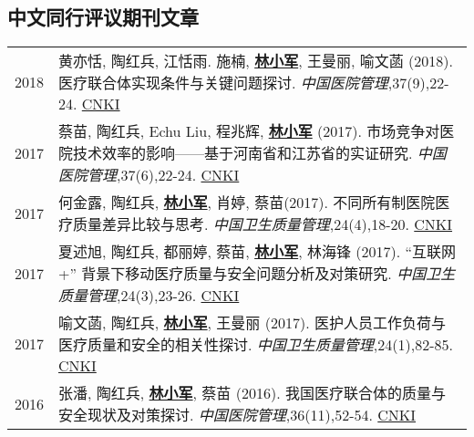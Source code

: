 \documentclass{resume}
\begin{document}
\subsection*{\textbf{中文同行评议期刊文章}}
\begin{longtable}{r p{14cm}}

2018 & 黄亦恬, 陶红兵, 江恬雨. 施楠, \underline{\textbf{林小军}}, 王曼丽, 喻文菡 (2018). 医疗联合体实现条件与关键问题探讨. \emph{中国医院管理},37(9),22-24. \href{http://kns.cnki.net/KCMS/detail/detail.aspx?dbcode=CJFQ&dbname=CJFDLAST2018&filename=YYGL201809005&v=MjIxMjdlWnVadEZpRGxWNzNPUERUTVlyRzRIOW5NcG85RllZUjhlWDFMdXhZUzdEaDFUM3FUcldNMUZyQ1VSTEs=}{CNKI} \\
2017 & 蔡苗, 陶红兵, Echu Liu, 程兆辉, \underline{\textbf{林小军}} (2017). 市场竞争对医院技术效率的影响——基于河南省和江苏省的实证研究. \emph{中国医院管理},37(6),22-24. \href{http://kns.cnki.net/KCMS/detail/detail.aspx?dbcode=CJFQ&dbname=CJFDLAST2017&filename=YYGL201706012&v=MzEzMTREbFZMdkFQRFRNWXJHNEg5Yk1xWTlFWm9SOGVYMUx1eFlTN0RoMVQzcVRyV00xRnJDVVJMS2VadVp0Rmk=}{CNKI}\\
2017 & 何金露, 陶红兵, \underline{\textbf{林小军}}, 肖婷, 蔡苗(2017). 不同所有制医院医疗质量差异比较与思考. \emph{中国卫生质量管理},24(4),18-20. \href{http://kns.cnki.net/KCMS/detail/detail.aspx?dbcode=CJFQ&dbname=CJFDLAST2017&filename=WSJG201704010&v=MTU5NzM0OUVaSVI4ZVgxTHV4WVM3RGgxVDNxVHJXTTFGckNVUkxLZVp1WnRGaURtVTcvTU1qN0JhYkc0SDliTXE=}{CNKI}\\
2017 & 夏述旭, 陶红兵, 都丽婷, 蔡苗, \underline{\textbf{林小军}}, 林海锋 (2017). “互联网+” 背景下移动医疗质量与安全问题分析及对策研究. \emph{中国卫生质量管理},24(3),23-26. \href{http://kns.cnki.net/KCMS/detail/detail.aspx?dbcode=CJFQ&dbname=CJFDLAST2017&filename=WSJG201703030&v=MjQwMTVHWklSOGVYMUx1eFlTN0RoMVQzcVRyV00xRnJDVVJMS2VadVp0RmlEbVViL01NajdCYWJHNEg5Yk1ySTk=}{CNKI}\\
2017 & 喻文菡, 陶红兵, \underline{\textbf{林小军}}, 王曼丽 (2017). 医护人员工作负荷与医疗质量和安全的相关性探讨. \emph{中国卫生质量管理},24(1),82-85. \href{http://kns.cnki.net/KCMS/detail/detail.aspx?dbcode=CJFQ&dbname=CJFDLAST2017&filename=WSJG201701013&v=MDI5NThSOGVYMUx1eFlTN0RoMVQzcVRyV00xRnJDVVJMS2VadVp0RmlEbVY3M09NajdCYWJHNEg5Yk1ybzlFWjQ=}{CNKI}\\
2016 & 张潘, 陶红兵,  \underline{\textbf{林小军}}, 蔡苗 (2016). 我国医疗联合体的质量与安全现状及对策探讨. \emph{中国医院管理},36(11),52-54. \href{http://kns.cnki.net/KCMS/detail/detail.aspx?dbcode=CJFQ&dbname=CJFDLAST2016&filename=YYGL201611027&v=MjM5Mjl1WnNGaXZtVTcvS1BEVE1Zckc0SDlmTnJvOUhZNFI4ZVgxTHV4WVM3RGgxVDNxVHJXTTFGckNVUkxLZVo=}{CNKI}\\

\end{longtable}
\end{document}
